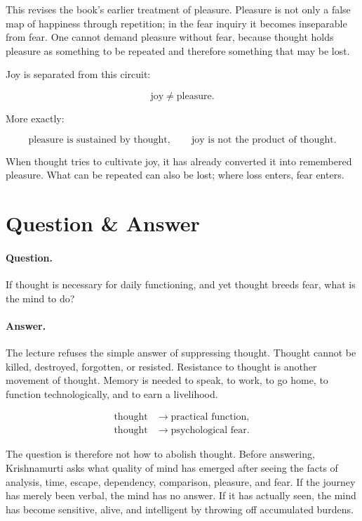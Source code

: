 \documentclass[11pt,oneside]{book}
\begin{document}
This revises the book's earlier treatment of pleasure. Pleasure is not only a false map of happiness through repetition; in the fear inquiry it becomes inseparable from fear. One cannot demand pleasure without fear, because thought holds pleasure as something to be repeated and therefore something that may be lost.

Joy is separated from this circuit:

\begin{equation}
\text{joy} \neq \text{pleasure}.
\end{equation}

More exactly:

\begin{equation}
\text{pleasure is sustained by thought},
\qquad
\text{joy is not the product of thought}.
\end{equation}

When thought tries to cultivate joy, it has already converted it into remembered pleasure. What can be repeated can also be lost; where loss enters, fear enters.

\section{Question \& Answer}

\paragraph{Question.}
If thought is necessary for daily functioning, and yet thought breeds fear, what is the mind to do?

\paragraph{Answer.}
The lecture refuses the simple answer of suppressing thought. Thought cannot be killed, destroyed, forgotten, or resisted. Resistance to thought is another movement of thought. Memory is needed to speak, to work, to go home, to function technologically, and to earn a livelihood.

\begin{align}
\text{thought} &\longrightarrow \text{practical function},\\
\text{thought} &\longrightarrow \text{psychological fear}.
\end{align}

The question is therefore not how to abolish thought. Before answering, Krishnamurti asks what quality of mind has emerged after seeing the facts of analysis, time, escape, dependency, comparison, pleasure, and fear. If the journey has merely been verbal, the mind has no answer. If it has actually seen, the mind has become sensitive, alive, and intelligent by throwing off accumulated burdens.
\end{document}
